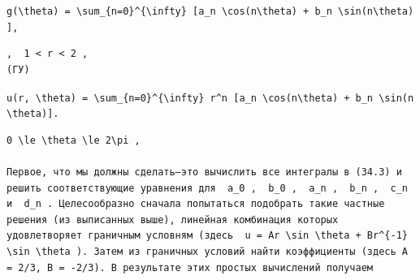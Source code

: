 \documentclass[
  ukrainian,
]{article}
\begin{document}
\texttt{g(\textbackslash{}theta)\ =\ \textbackslash{}sum\_\{n=0\}\^{}\{\textbackslash{}infty\}\ {[}a\_n\ \textbackslash{}cos(n\textbackslash{}theta)\ +\ b\_n\ \textbackslash{}sin(n\textbackslash{}theta){]},}

\begin{verbatim}
,  1 < r < 2 ,  
(ГУ)
\end{verbatim}

\texttt{u(r,\ \textbackslash{}theta)\ =\ \textbackslash{}sum\_\{n=0\}\^{}\{\textbackslash{}infty\}\ r\^{}n\ {[}a\_n\ \textbackslash{}cos(n\textbackslash{}theta)\ +\ b\_n\ \textbackslash{}sin(n\textbackslash{}theta){]}.}

\begin{verbatim}
0 \le \theta \le 2\pi ,

Первое, что мы должны сделать—это вычислить все интегралы в (34.3) и решить соответствующие уравнения для  a_0 ,  b_0 ,  a_n ,  b_n ,  c_n  и  d_n . Целесообразно сначала попытаться подобрать такие частные решения (из выписанных выше), линейная комбинация которых удовлетворяет граничным условням (здесь  u = Ar \sin \theta + Br^{-1} \sin \theta ). Затем из граничных условий найти коэффициенты (здесь A = 2/3, B = -2/3). В результате этих простых вычислений получаем
\end{verbatim}
\end{document}
